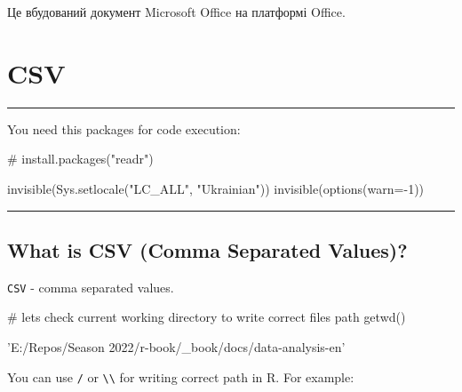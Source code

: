 \documentclass[
  letterpaper,
  DIV=11,
  numbers=noendperiod]{scrreprt}
\newenvironment{Shaded}{\begin{snugshade}}{\end{snugshade}}
\newcommand{\AttributeTok}[1]{\textcolor[rgb]{0.40,0.45,0.13}{#1}}
\newcommand{\CommentTok}[1]{\textcolor[rgb]{0.37,0.37,0.37}{#1}}
\newcommand{\DecValTok}[1]{\textcolor[rgb]{0.68,0.00,0.00}{#1}}
\newcommand{\FunctionTok}[1]{\textcolor[rgb]{0.28,0.35,0.67}{#1}}
\newcommand{\NormalTok}[1]{\textcolor[rgb]{0.00,0.23,0.31}{#1}}
\newcommand{\SpecialCharTok}[1]{\textcolor[rgb]{0.37,0.37,0.37}{#1}}
\newcommand{\StringTok}[1]{\textcolor[rgb]{0.13,0.47,0.30}{#1}}
\begin{document}
Це вбудований документ Microsoft Office на платформі Office.

\chapter{CSV}\label{csv}

\begin{center}\rule{0.5\linewidth}{0.5pt}\end{center}

You need this packages for code execution:

\begin{Shaded}
\begin{Highlighting}[]
\CommentTok{\# install.packages("readr")}
\end{Highlighting}
\end{Shaded}

\begin{Shaded}
\begin{Highlighting}[]
\FunctionTok{invisible}\NormalTok{(}\FunctionTok{Sys.setlocale}\NormalTok{(}\StringTok{"LC\_ALL"}\NormalTok{, }\StringTok{"Ukrainian"}\NormalTok{))}
\FunctionTok{invisible}\NormalTok{(}\FunctionTok{options}\NormalTok{(}\AttributeTok{warn=}\SpecialCharTok{{-}}\DecValTok{1}\NormalTok{))}
\end{Highlighting}
\end{Shaded}

\begin{center}\rule{0.5\linewidth}{0.5pt}\end{center}

\section{What is CSV (Comma Separated
Values)?}\label{what-is-csv-comma-separated-values}

\texttt{CSV} - comma separated values.

\begin{Shaded}
\begin{Highlighting}[]
\CommentTok{\# lets check current working directory to write correct files path}
\FunctionTok{getwd}\NormalTok{()}
\end{Highlighting}
\end{Shaded}

'E:/Repos/Season 2022/r-book/\_book/docs/data-analysis-en'

You can use \texttt{/} or \texttt{\textbackslash{}\textbackslash{}} for
writing correct path in R. For example:
\end{document}
